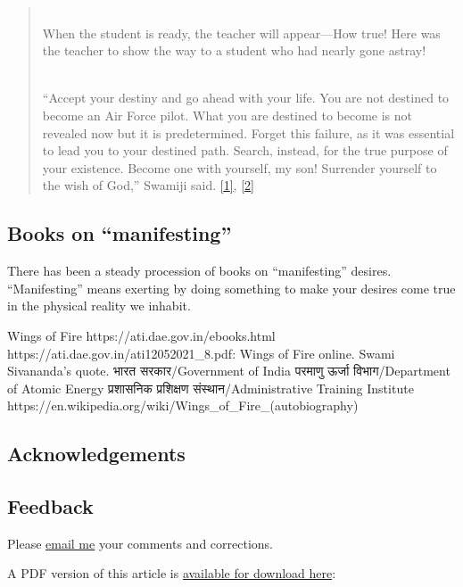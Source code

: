 \documentclass[
  a4paper,
]{article}
\begin{document}
\begin{quote}
\strut \\
When the student is ready, the teacher will appear---How true! Here was
the teacher to show the way to a student who had nearly gone astray!\\
\strut \\
``Accept your destiny and go ahead with your life. You are not destined
to become an Air Force pilot. What you are destined to become is not
revealed now but it is predetermined. Forget this failure, as it was
essential to lead you to your destined path. Search, instead, for the
true purpose of your existence. Become one with yourself, my son!
Surrender yourself to the wish of God,'' Swamiji said.
\protect\hyperlink{ref-kalam-wof-1999}{{[}1{]}},
\protect\hyperlink{ref-kalam-wof-online}{{[}2{]}}
\end{quote}

\hypertarget{books-on-manifesting}{%
\subsection{Books on ``manifesting''}\label{books-on-manifesting}}

There has been a steady procession of books on ``manifesting'' desires.
``Manifesting'' means exerting by doing something to make your desires
come true in the physical reality we inhabit.

Wings of Fire https://ati.dae.gov.in/ebooks.html
https://ati.dae.gov.in/ati12052021\_8.pdf: Wings of Fire online. Swami
Sivananda's quote. भारत सरकार/Government of India परमाणु ऊर्जा
विभाग/Department of Atomic Energy प्रशासनिक प्रशिक्षण संस्‍थान/Administrative
Training Institute
https://en.wikipedia.org/wiki/Wings\_of\_Fire\_(autobiography)

\hypertarget{acknowledgements}{%
\subsection{Acknowledgements}\label{acknowledgements}}

\hypertarget{feedback}{%
\subsection{Feedback}\label{feedback}}

Please \href{mailto:feedback.swanlotus@gmail.com}{email me} your
comments and corrections.

\noindent A PDF version of this article is
\href{./feeling.pdf}{available for download here}:
\end{document}

